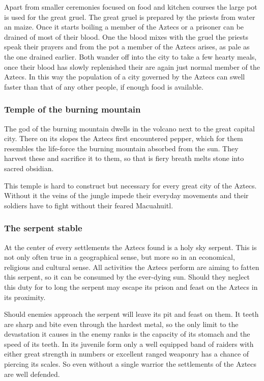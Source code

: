 \documentclass[a4paper]{book}
\begin{document}
Apart from smaller ceremonies focused on food and kitchen courses the large pot
is used for the great gruel. The great gruel is prepared by the priests from
water an maize. Once it starts boiling a member of the \gls{Aztecs} or a
prisoner can be drained of most of their blood. One the blood mixes with the
gruel the priests speak their prayers and from the pot a member of the
\gls{Aztecs} arises, as pale as the one drained earlier. Both wander off into
the city to take a few hearty meals, once their blood has slowly replenished
their are again just normal member of the \gls{Aztecs}. In this way the
population of a city governed by the \gls{Aztecs} can swell faster than that of
any other people, if enough food is available.

\subsubsection{Temple of the burning mountain}
The god of the burning mountain dwells in the volcano next to the great capital
city. There on its slopes the \gls{Aztecs} first encountered pepper, which for
them resembles the life-force the burning mountain absorbed from the sun. They
harvest these and sacrifice it to them, so that is fiery breath melts stone
into sacred obsidian.

This temple is hard to construct but necessary for every great city of the
\gls{Aztecs}. Without it the veins of the jungle impede their everyday
movements and their soldiers have to fight without their feared Macuahuitl.

\subsubsection{The serpent stable}
At the center of every settlements the \gls{Aztecs} found is a holy sky
serpent. This is not only often true in a geographical sense, but more so in an
economical, religious and cultural sense. All activities the \gls{Aztecs}
perform are aiming to fatten this serpent, so it can be consumed by the
ever-dying sun. Should they neglect this duty for to long the serpent may
escape its prison and feast on the \gls{Aztecs} in its proximity.

Should enemies approach the serpent will leave its pit and feast on them. It
teeth are sharp and bite even through the hardest metal, so the only limit to
the devastation it causes in the enemy ranks is the capacity of its stomach and
the speed of its teeth. In its juvenile form only a well equipped band of
raiders with either great strength in numbers or excellent ranged weaponry has
a chance of piercing its scales. So even without a single warrior the
settlements of the \gls{Aztecs} are well defended.
\end{document}
